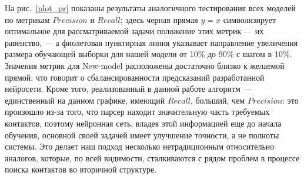 На рис.~\ref{plot_pr} показаны результаты аналогичного тестирования всех моделей по метрикам $Precision$ и $Recall$; здесь черная прямая $y=x$ символизирует оптимальное для рассматриваемой задачи положение этих метрик --- их равенство, --- а фиолетовая пунктирная линия указывает направление увеличения размера обучающей выборки для нашей модели от 10\% до 90\% с шагом в 10\%. Значения метрик для New-model расположены достаточно близко к желаемой прямой, что говорит о сбалансированности предсказаний разработанной нейросети. Кроме того, реализованный в данной работе алгоритм --- единственный на данном графике, имеющий $Recall$, больший, чем $Precision$: это произошло из-за того, что парсер находит значительную часть требуемых контактов, поэтому нейронная сеть, владея этой информацией еще до начала обучения, основной своей задачей имеет улучшение точности, а не полноты системы. Это делает наш подход несколько нетрадиционным относительно аналогов, которые, по всей видимости, сталкиваются с рядом проблем в процессе поиска контактов во вторичной структуре.

